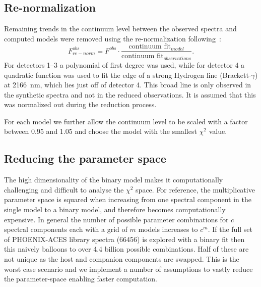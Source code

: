 \documentclass[fleqn,usenatbib]{mnras}
\newcommand*\bl{\color{blue}}
\begin{document}
    \subsection{Re-normalization}
    \label{subsec:renorm}
    {\bl Remaining} trends in the continuum level between the observed spectra and computed models were removed using the re-normalization following~\citep{passegger_fundamental_2016}:
    \begin{equation}
    F^{obs}_{re-norm} = F^{obs} \cdot \frac{\textrm{continuum fit}_{model}}{\textrm{continuum fit}_{observations}}.
    \end{equation}
    For detectors 1--3 a polynomial of first degree was used, while for detector 4 a quadratic function was used to fit the edge of a strong Hydrogen line (Brackett-\(\gamma\)) at 2166~nm, which lies just off of detector 4. This broad line is only observed in the synthetic spectra and not in the reduced observations. It is assumed that this was normalized out during the reduction process.
    
    For each model we further allow the continuum level to be {\bl scaled with a factor between 0.95 and 1.05} and choose the model with the smallest \(\chi^2\) value.
    
    \subsection{Reducing the parameter space}
    \label{subsec:reduce-params}
    The high dimensionality of the binary model makes it computationally challenging and difficult to analyse the \(\chi^2\) space.
    For reference, the multiplicative parameter space is squared when increasing from one spectral component in the single model to a binary model, and therefore becomes computationally expensive. In general the number of possible parameter combinations for \(c\) spectral components each with a grid of \(m\) models increases to \(c^m\). If the full set of PHOENIX-ACES library spectra (66456) is explored with a binary fit then this naively balloons to over 4.4 billion possible combinations. Half of these are not unique as the host and companion components are swapped. This is the worst case scenario and we implement a number of assumptions to vastly reduce the parameter-space enabling faster computation.
    
\end{document}
